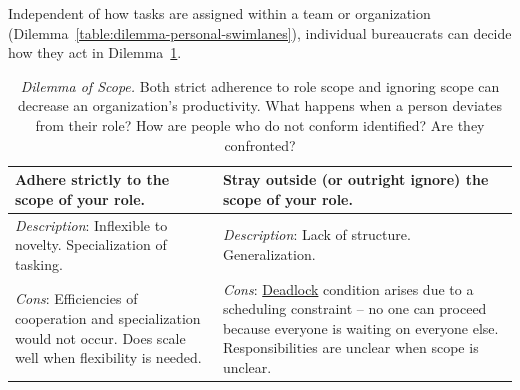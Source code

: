 Independent of how tasks are assigned within a team or organization (Dilemma~\ref{table:dilemma-personal-swimlanes}), individual bureaucrats can decide how they act in Dilemma~\ref{table:dilemma-personal-scope-of-activity}.



\begin{center}
\begin{table}[H] %
\begin{tabular}{ | m{\dilemmatablewidth}| m{\dilemmatablewidth} | }
  \hline
  \textbf{Adhere strictly to the scope of your role.} & 
  \textbf{Stray outside (or outright ignore) the scope of your role.} \\ 
  \hline
  \textit{Description}: Inflexible to novelty. Specialization of tasking. & 
  \textit{Description}: Lack of structure. Generalization. \\ 
  \hline
  \textit{Cons}: Efficiencies of cooperation and specialization would not occur. Does scale well when flexibility is needed.  & 
  \textit{Cons}: \href{https://en.wikipedia.org/wiki/Deadlock}{Deadlock} 
  \index{Wikipedia!\href{https://en.wikipedia.org/wiki/Deadlock}{Deadlock}}
  condition arises due to a scheduling constraint -- no one can proceed because everyone is waiting on everyone else. Responsibilities are unclear when scope is unclear. \\  
  \hline
\end{tabular}
\caption{
\textit{Dilemma of Scope.}
Both strict adherence to role scope and ignoring scope can decrease an organization's productivity. 
What happens when a person deviates from their role?
How are people who do not conform identified? Are they confronted?
}
\label{table:dilemma-personal-scope-of-activity}
\end{table}
\end{center}

